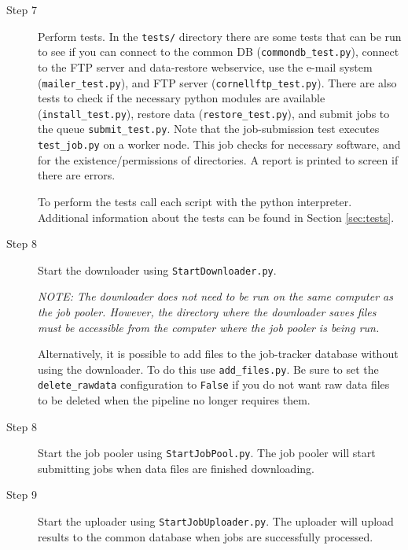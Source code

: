 \documentclass[12pt]{article}
\begin{document}
\begin{description}
    \item[Step 7] Perform tests. In the \texttt{tests/} directory there are some tests that can be run to see if you can connect to the common DB (\texttt{commondb\_test.py}), connect to the FTP server and data-restore webservice, use the e-mail system (\texttt{mailer\_test.py}), and FTP server (\texttt{cornellftp\_test.py}). There are also tests to check if the necessary python modules are available (\texttt{install\_test.py}), restore data (\texttt{restore\_test.py}), and submit jobs to the queue \texttt{submit\_test.py}. Note that the job-submission test executes \texttt{test\_job.py} on a worker node. This job checks for necessary software, and for the existence/permissions of directories. A report is printed to screen if there are errors. 
    
    To perform the tests call each script with the python interpreter. Additional information about the tests can be found in Section \ref{sec:tests}.

    \item[Step 8] Start the downloader using \texttt{StartDownloader.py}.
        
        \smallskip
        
        \textit{NOTE: The downloader does not need to be run on the same computer as the job pooler. However, the directory where the downloader saves files must be accessible from the computer where the job pooler is being run.}
        
        \smallskip
        
        Alternatively, it is possible to add files to the job-tracker database without using the downloader. To do this use \texttt{add\_files.py}. Be sure to set the \texttt{delete\_rawdata} configuration to \texttt{False} if you do not want raw data files to be deleted when the pipeline no longer requires them. 

    \item[Step 8] Start the job pooler using \texttt{StartJobPool.py}. The job pooler will start submitting jobs when data files are finished downloading. 

    \item[Step 9] Start the uploader using \texttt{StartJobUploader.py}. The uploader will upload results to the common database when jobs are successfully processed.
\end{description}
\end{document}

